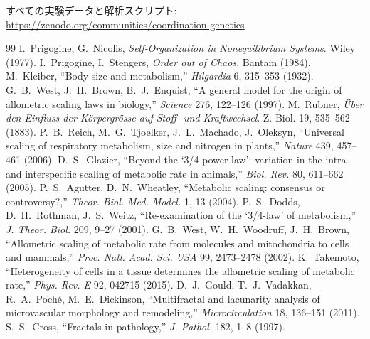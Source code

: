 \documentclass[12pt]{article}
\begin{document}
	すべての実験データと解析スクリプト:\\
	\url{https://zenodo.org/communities/coordination-genetics}
	
	\begin{thebibliography}{99}
		 I.~Prigogine, G.~Nicolis, \emph{Self‑Organization in Nonequilibrium Systems}. Wiley (1977).
		 I.~Prigogine, I.~Stengers, \emph{Order out of Chaos}. Bantam (1984).
		 M.~Kleiber, ``Body size and metabolism,'' \emph{Hilgardia} 6, 315–353 (1932).
		 G.~B.~West, J.~H.~Brown, B.~J.~Enquist, ``A general model for the origin of allometric scaling laws in biology,'' \emph{Science} 276, 122–126 (1997).
		 M.~Rubner, \emph{Über den Einfluss der Körpergrösse auf Stoff- und Kraftwechsel}. Z. Biol. 19, 535–562 (1883).
		 P.~B.~Reich, M.~G.~Tjoelker, J.~L.~Machado, J.~Oleksyn, ``Universal scaling of respiratory metabolism, size and nitrogen in plants,'' \emph{Nature} 439, 457–461 (2006).
		 D.~S.~Glazier, ``Beyond the `3/4-power law': variation in the intra- and interspecific scaling of metabolic rate in animals,'' \emph{Biol. Rev.} 80, 611–662 (2005).
		 P.~S.~Agutter, D.~N.~Wheatley, ``Metabolic scaling: consensus or controversy?,'' \emph{Theor. Biol. Med. Model.} 1, 13 (2004).
		 P.~S.~Dodds, D.~H.~Rothman, J.~S.~Weitz, ``Re-examination of the `3/4-law' of metabolism,'' \emph{J. Theor. Biol.} 209, 9–27 (2001).
		 G.~B.~West, W.~H.~Woodruff, J.~H.~Brown, ``Allometric scaling of metabolic rate from molecules and mitochondria to cells and mammals,'' \emph{Proc. Natl. Acad. Sci. USA} 99, 2473–2478 (2002).
		 K.~Takemoto, ``Heterogeneity of cells in a tissue determines the allometric scaling of metabolic rate,'' \emph{Phys. Rev. E} 92, 042715 (2015).
		 D.~J.~Gould, T.~J.~Vadakkan, R.~A.~Poché, M.~E.~Dickinson, ``Multifractal and lacunarity analysis of microvascular morphology and remodeling,'' \emph{Microcirculation} 18, 136–151 (2011). %
		 S.~S.~Cross, ``Fractals in pathology,'' \emph{J. Pathol.} 182, 1–8 (1997). %
	\end{thebibliography}
	
\end{document}
